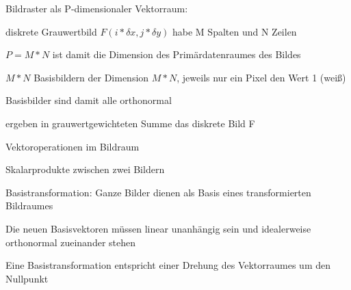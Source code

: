 \documentclass[landscape]{article}
\begin{document}
\begin{multicols}{3}
  Bildraster als P-dimensionaler Vektorraum:
  \begin{itemize*}
    \item diskrete Grauwertbild $F (i* \delta x, j * \delta y )$ habe M Spalten und N Zeilen
    \item $P = M * N$ ist damit die Dimension des Primärdatenraumes des Bildes
    \item $M * N$ Basisbildern der Dimension $M * N$, jeweils nur ein Pixel den Wert 1 (weiß)
    \item Basisbilder sind damit alle orthonormal
    \item ergeben in grauwertgewichteten Summe das diskrete Bild F
  \end{itemize*}
  
  Vektoroperationen im Bildraum
  \begin{itemize*}
    \item Skalarprodukte zwischen zwei Bildern
    \item Basistransformation: Ganze Bilder dienen als Basis eines transformierten Bildraumes
    \item Die neuen Basisvektoren müssen linear unanhängig sein und idealerweise orthonormal zueinander stehen
    \item Eine Basistransformation entspricht einer Drehung des Vektorraumes um den Nullpunkt
  \end{itemize*}
  

\end{multicols}
\end{document}
